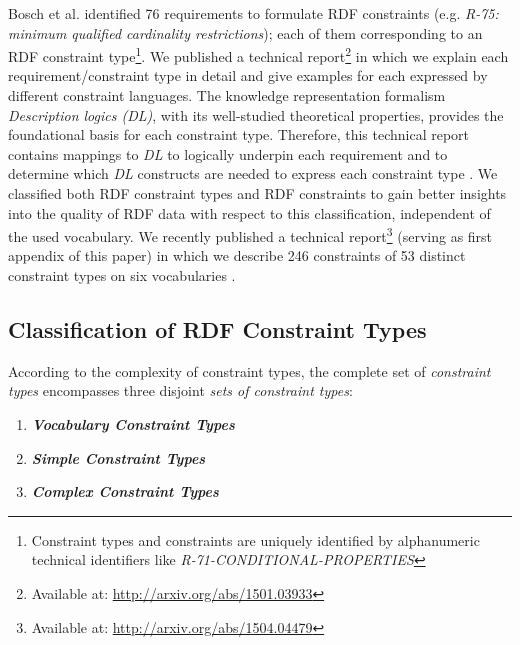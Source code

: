 \documentclass{llncs}
\begin{document}
Bosch et al. identified 76 requirements to formulate RDF constraints (e.g. \emph{R-75: minimum qualified cardinality restrictions}); each of them corresponding to an RDF constraint type\footnote{Constraint types and constraints are uniquely identified by alphanumeric technical identifiers like \emph{R-71-CONDITIONAL-PROPERTIES}}\cite{BoschNolleAcarEckert2015}. 
We published a technical report\footnote{Available at: \url{http://arxiv.org/abs/1501.03933}} in which we explain each requirement/constraint type in detail and give examples for each expressed by different constraint languages.
The knowledge representation formalism \emph{Description logics (DL)}, with its  well-studied theoretical properties, provides the foundational basis for each constraint type.
Therefore, this technical report contains mappings to \emph{DL} to logically underpin each requirement and to determine which \emph{DL} constructs are needed to express each constraint type \cite{BoschNolleAcarEckert2015}.
We classified both RDF constraint types and RDF constraints to gain better insights into the quality of RDF data with respect to this classification, independent of the used vocabulary.
We recently published a technical report\footnote{\label{technical-report-1}Available at: \url{http://arxiv.org/abs/1504.04479}} (serving as first appendix of this paper) in which we describe 246 constraints of 53 distinct constraint types on six vocabularies \cite{BoschZapilkoWackerowEckert2015}.

\subsection{Classification of RDF Constraint Types}

According to the complexity of constraint types, the complete set of \emph{constraint types} encompasses three disjoint \emph{sets of constraint types}:
\begin{enumerate}
	\item \textbf{\emph{Vocabulary Constraint Types}}
	\item \textbf{\emph{Simple Constraint Types}}
	\item \textbf{\emph{Complex Constraint Types}}
\end{enumerate}
\end{document}
